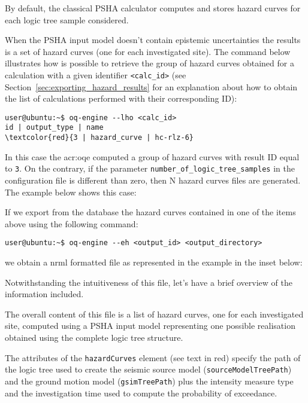 By default, the classical PSHA calculator computes and stores hazard curves
for each logic tree sample considered.

When the PSHA input model doesn't contain epistemic uncertainties the results
is a set of hazard curves (one for each investigated site). The command below
illustrates how is possible to retrieve the group of hazard curves obtained
for a calculation with a given identifier \texttt{<calc\_id>} (see
Section~\ref{sec:exporting_hazard_results} for an explanation about how to
obtain the list of calculations performed with their corresponding ID):

\begin{Verbatim}[frame=single, commandchars=\\\{\}, fontsize=\small]
user@ubuntu:~$ oq-engine --lho <calc_id>
id | output_type | name
\textcolor{red}{3 | hazard_curve | hc-rlz-6}
\end{Verbatim}

In this case the \gls{acr:oqe} computed a group of hazard curves with result
ID equal to \texttt{3}. On the contrary, if the parameter
\texttt{number\_of\_logic\_tree\_samples} in the configuration file is
different than zero, then N hazard curves files are generated. The example
below shows this case:



If we export from the database the hazard curves contained in one of the
items above using the following command:

\begin{Verbatim}[frame=single, commandchars=\\\{\}, fontsize=\small]
user@ubuntu:~$ oq-engine --eh <output_id> <output_directory>
\end{Verbatim}

we obtain a nrml formatted file as represented in the example in the inset
below:



Notwithstanding the intuitiveness of this file, let's have a brief
overview of the information included.

The overall content of this file is a list of hazard curves, one for each
investigated site, computed using a PSHA input model representing one possible
realisation obtained using the complete logic tree structure.

The attributes of the \texttt{hazardCurves} element (see text in red) specify
the path of the logic tree used to create the seismic source model
(\texttt{source\-Model\-TreePath}) and the ground motion model
(\texttt{gsim\-Tree\-Path}) plus the intensity measure type and the
investigation time used to compute the probability of exceedance.

